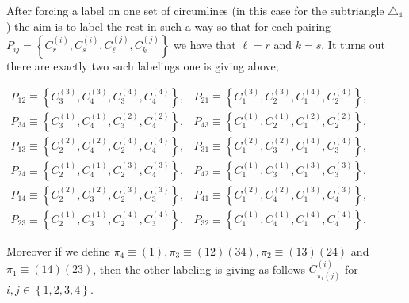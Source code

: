 \documentclass[11pt]{article}
\begin{document}
\bigskip 

After forcing a label on one set of circumlines (in this case for the
subtriangle $\triangle _{4}$) the aim is to label the rest in such a way so
that for each pairing $P_{ij}=\left\{ C_{r}^{\left( i\right) },C_{s}^{\left(
i\right) },C_{\ell }^{\left( j\right) },C_{k}^{\left( j\right) }\right\} $
we have that $\ell =r$ and $k=s$. It turns out there are exactly two such
labelings one is giving above;

\bigskip $%
\begin{array}{cc}
P_{12}\equiv \left\{ C_{3}^{\left( 3\right) },C_{4}^{\left( 3\right)
},C_{3}^{\left( 4\right) },C_{4}^{\left( 4\right) }\right\} , & P_{21}\equiv
\left\{ C_{1}^{\left( 3\right) },C_{2}^{\left( 3\right) },C_{1}^{\left(
4\right) },C_{2}^{\left( 4\right) }\right\} , \\ 
P_{34}\equiv \left\{ C_{3}^{\left( 1\right) },C_{4}^{\left( 1\right)
},C_{3}^{\left( 2\right) },C_{4}^{\left( 2\right) }\right\} , & P_{43}\equiv
\left\{ C_{1}^{\left( 1\right) },C_{2}^{\left( 1\right) },C_{1}^{\left(
2\right) },C_{2}^{\left( 2\right) }\right\} , \\ 
P_{13}\equiv \left\{ C_{2}^{\left( 2\right) },C_{4}^{\left( 2\right)
},C_{2}^{\left( 4\right) },C_{4}^{\left( 4\right) }\right\} , & P_{31}\equiv
\left\{ C_{1}^{\left( 2\right) },C_{3}^{\left( 2\right) },C_{1}^{\left(
4\right) },C_{3}^{\left( 4\right) }\right\} , \\ 
P_{24}\equiv \left\{ C_{2}^{\left( 1\right) },C_{4}^{\left( 1\right)
},C_{2}^{\left( 3\right) },C_{4}^{\left( 3\right) }\right\} , & P_{42}\equiv
\left\{ C_{1}^{\left( 1\right) },C_{3}^{\left( 1\right) },C_{1}^{\left(
3\right) },C_{3}^{\left( 3\right) }\right\} , \\ 
P_{14}\equiv \left\{ C_{2}^{\left( 2\right) },C_{3}^{\left( 2\right)
},C_{2}^{\left( 3\right) },C_{3}^{\left( 3\right) }\right\} , & P_{41}\equiv
\left\{ C_{1}^{\left( 2\right) },C_{4}^{\left( 2\right) },C_{1}^{\left(
3\right) },C_{4}^{\left( 3\right) }\right\} , \\ 
P_{23}\equiv \left\{ C_{2}^{\left( 1\right) },C_{3}^{\left( 1\right)
},C_{2}^{\left( 4\right) },C_{3}^{\left( 4\right) }\right\} , & P_{32}\equiv
\left\{ C_{1}^{\left( 1\right) },C_{4}^{\left( 1\right) },C_{1}^{\left(
4\right) },C_{4}^{\left( 4\right) }\right\} .%
\end{array}%
$\newline

Moreover if we define $\pi _{4}\equiv \left( 1\right) ,\pi _{3}\equiv \left(
12\right) \left( 34\right) ,\pi _{2}\equiv \left( 13\right) \left( 24\right) 
$ and $\pi _{1}\equiv \left( 14\right) \left( 23\right) $, then the other
labeling is giving as follows $C_{\pi _{i}\left( j\right) }^{\left( i\right)
}$ for $i,j\in \left\{ 1,2,3,4\right\} $.
\end{document}
